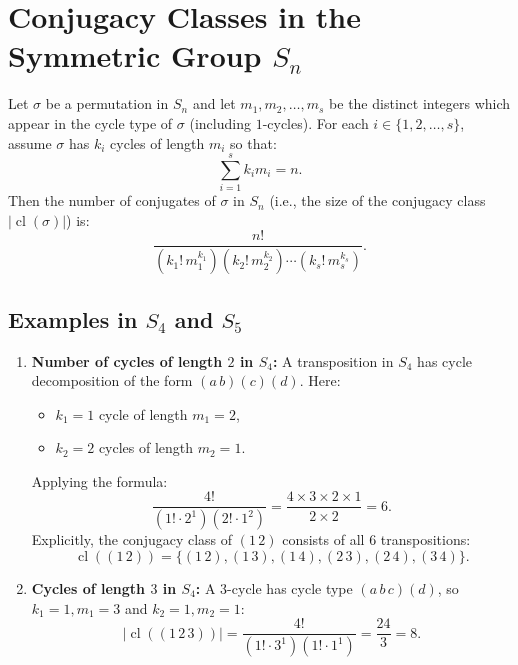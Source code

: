 \section{Conjugacy Classes in the Symmetric Group \texorpdfstring{$S_n$}{S\_n}}

\begin{theorem}
Let $\sigma$ be a permutation in $S_n$ and let $m_1, m_2, \dots, m_s$ be the distinct integers which appear in the cycle type of $\sigma$ (including $1$-cycles). For each $i \in \{1, 2, \dots, s\}$, assume $\sigma$ has $k_i$ cycles of length $m_i$ so that:
\[
\sum_{i=1}^s k_i m_i = n.
\]
Then the number of conjugates of $\sigma$ in $S_n$ (i.e., the size of the conjugacy class $|\operatorname{cl}(\sigma)|$) is:
\[
\frac{n!}{(k_1! \, m_1^{k_1})(k_2! \, m_2^{k_2}) \cdots (k_s! \, m_s^{k_s})}.
\]
\end{theorem}

\subsection{Examples in \texorpdfstring{$S_4$}{S\_4} and \texorpdfstring{$S_5$}{S\_5}}

\begin{example}
\begin{enumerate}[label=(\alph*)]
    \item \textbf{Number of cycles of length $2$ in $S_4$:}
    A transposition in $S_4$ has cycle decomposition of the form $(a\,b)(c)(d)$. Here:
    \begin{itemize}
        \item $k_1 = 1$ cycle of length $m_1 = 2$,
        \item $k_2 = 2$ cycles of length $m_2 = 1$.
    \end{itemize}
    Applying the formula:
    \[
    \frac{4!}{(1! \cdot 2^1)(2! \cdot 1^2)} = \frac{4 \times 3 \times 2 \times 1}{2 \times 2} = 6.
    \]
    Explicitly, the conjugacy class of $(1\,2)$ consists of all $6$ transpositions:
    \[
    \operatorname{cl}((1\,2)) = \{(1\,2), (1\,3), (1\,4), (2\,3), (2\,4), (3\,4)\}.
    \]
    
    \item \textbf{Cycles of length $3$ in $S_4$:}
    A $3$-cycle has cycle type $(a\,b\,c)(d)$, so $k_1 = 1, m_1 = 3$ and $k_2 = 1, m_2 = 1$:
    \[
    |\operatorname{cl}((1\,2\,3))| = \frac{4!}{(1! \cdot 3^1)(1! \cdot 1^1)} = \frac{24}{3} = 8.
    \]
\end{enumerate}
\end{example}

